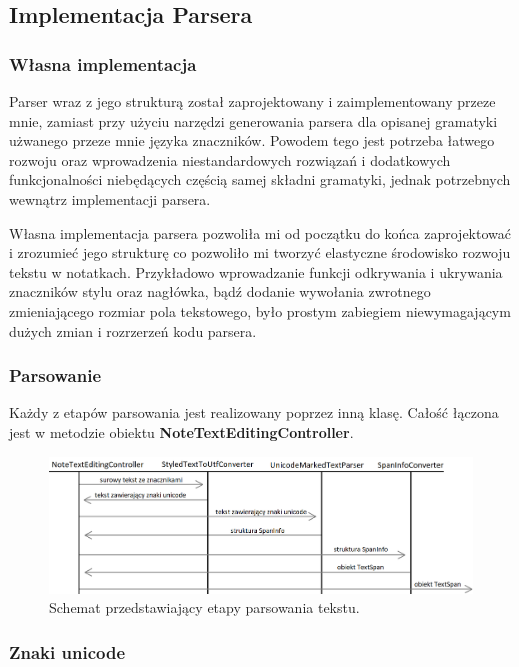 \subsection{Implementacja Parsera}

\subsubsection{Własna implementacja}

Parser wraz z jego strukturą został zaprojektowany i zaimplementowany przeze mnie, zamiast przy użyciu narzędzi generowania parsera dla opisanej gramatyki użwanego przeze mnie języka znaczników. Powodem tego jest potrzeba łatwego rozwoju oraz wprowadzenia niestandardowych rozwiązań i dodatkowych funkcjonalności niebędących częścią samej składni gramatyki, jednak potrzebnych wewnątrz implementacji parsera.

Własna implementacja parsera pozwoliła mi od początku do końca zaprojektować i zrozumieć jego strukturę co pozwoliło mi tworzyć elastyczne środowisko rozwoju tekstu w notatkach. Przykładowo wprowadzanie funkcji odkrywania i ukrywania znaczników stylu oraz nagłówka, bądź dodanie wywołania zwrotnego zmieniającego rozmiar pola tekstowego, było prostym zabiegiem niewymagającym dużych zmian i rozrzerzeń kodu parsera.

\subsubsection{Parsowanie}

Każdy z etapów parsowania jest realizowany poprzez inną klasę. Całość łączona jest w metodzie obiektu \textbf{NoteTextEditingController}.
\newline
\begin{figure}[ht]
    \centering
    \includegraphics[width=\linewidth]{images/etapy_parsowania.png}
    \caption{Schemat przedstawiający etapy parsowania tekstu.}
    \label{fig:etapyParsowania}
\end{figure}

\subsubsection{Znaki unicode}

